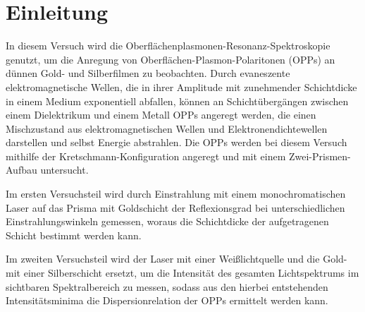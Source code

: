 \section{Einleitung}\label{sec:einleitung}
In diesem Versuch wird die Oberflächenplasmonen-Resonanz-Spektroskopie genutzt,
um die Anregung von Oberflächen-Plasmon-Polaritonen (OPPs) an dünnen Gold- und Silberfilmen
zu beobachten. Durch evaneszente elektromagnetische Wellen, die in ihrer Amplitude 
mit zunehmender Schichtdicke in einem Medium exponentiell abfallen, können an 
Schichtübergängen zwischen einem Dielektrikum und einem Metall OPPs
angeregt werden, die einen Mischzustand aus elektromagnetischen Wellen und Elektronendichtewellen 
darstellen und selbst Energie abstrahlen. 
Die OPPs werden bei diesem Versuch mithilfe der Kretschmann-Konfiguration angeregt
und mit einem Zwei-Prismen-Aufbau untersucht.\par
Im ersten Versuchsteil wird durch Einstrahlung mit einem monochromatischen
Laser auf das Prisma mit Goldschicht der Reflexionsgrad bei unterschiedlichen Einstrahlungswinkeln gemessen,
woraus die Schichtdicke der aufgetragenen Schicht bestimmt werden kann.\par 
Im zweiten Versuchsteil wird der Laser mit einer Weißlichtquelle und die Gold- mit 
einer Silberschicht ersetzt, um die Intensität 
des gesamten Lichtspektrums im sichtbaren Spektralbereich zu messen, sodass aus den hierbei 
entstehenden Intensitätsminima die Dispersionrelation der OPPs ermittelt werden kann.